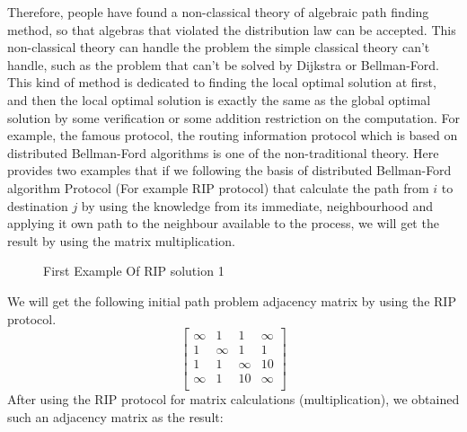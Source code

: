 \documentclass[a4paper,10pt]{article}
\begin{document}
Therefore, people have found a non-classical theory of algebraic path finding method, so that algebras that violated the distribution law can be accepted. This non-classical theory can handle the problem the simple classical theory can't handle, such as the problem that can't be solved by Dijkstra or Bellman-Ford.
This kind of method is dedicated to finding the local optimal solution at first, and then the local optimal solution is exactly the same as the global optimal solution by some verification or some addition restriction on the computation. For example, the famous protocol, the routing information protocol which is based on distributed Bellman-Ford algorithms is one of the non-traditional theory.
Here provides two examples that if we following the basis of distributed Bellman-Ford algorithm Protocol (For example RIP protocol) that calculate the path from $i$ to destination $j$ by using the knowledge from its immediate, neighbourhood and applying it own path to the neighbour available to the process, we will get the result by using the matrix multiplication.
\begin{figure}[H]
\centering
{}
\label{example:rip:1}
\caption{First Example Of RIP solution 1}
\end{figure}
We will get the following initial path problem adjacency matrix by using the RIP protocol.
\[
\begin{bmatrix}
    \infty & 1 & 1 & \infty \\
    1 & \infty & 1 & 1 \\
    1 & 1 & \infty & 10 \\
    \infty & 1 & 10 & \infty \\
\end{bmatrix}
\]
After using the RIP protocol for matrix calculations (multiplication), we obtained such an adjacency matrix as the result:
\end{document}
